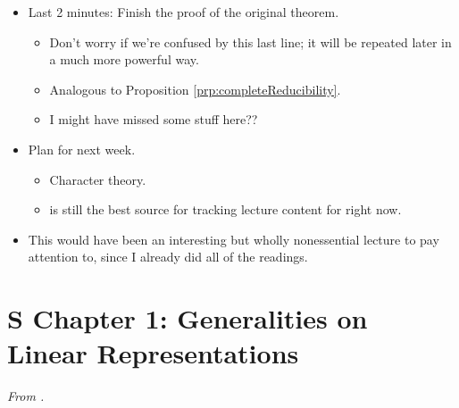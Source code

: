\documentclass[../notes.tex]{subfiles}
\begin{document}
\begin{itemize}
    \item Last 2 minutes: Finish the proof of the original theorem.
    \begin{itemize}
        \item Don't worry if we're confused by this last line; it will be repeated later in a much more powerful way.
        \item Analogous to Proposition \ref{prp:completeReducibility}.
        \item I might have missed some stuff here??
    \end{itemize}
    \item Plan for next week.
    \begin{itemize}
        \item Character theory.
        \item \textcite{bib:Serre} is still the best source for tracking lecture content for right now.
    \end{itemize}
    \item This would have been an interesting but wholly nonessential lecture to pay attention to, since I already did all of the readings.
\end{itemize}



\section{S Chapter 1: Generalities on Linear Representations}
\emph{From \textcite{bib:Serre}.}
\end{document}
